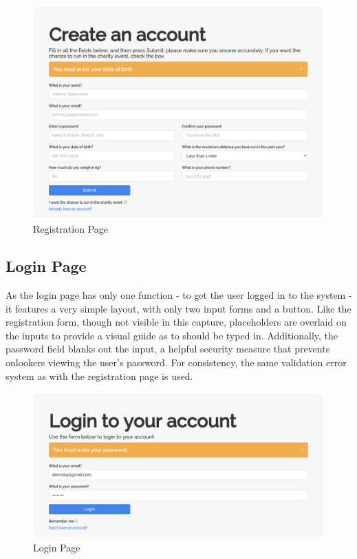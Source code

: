 \documentclass{article}[12pt,a4paper]
\begin{document}
\begin{figure}[h!]
  \includegraphics[scale=0.35]{final_ui/register}
  \caption{Registration Page}
\end{figure}
\clearpage

\subsection{Login Page}
As the login page has only one function - to get the user logged in to the system - it features a very simple layout, with only two input forms and a button. Like the registration form, though not visible in this capture, placeholders are overlaid on the inputs to provide a visual guide as to should be typed in. Additionally, the password field blanks out the input, a helpful security measure that prevents onlookers viewing the user's password. For consistency, the same validation error system as with the registration page is used.

\begin{figure}[h!]
  \includegraphics[scale=0.35]{final_ui/login}
  \caption{Login Page}
\end{figure}
\clearpage
\end{document}
